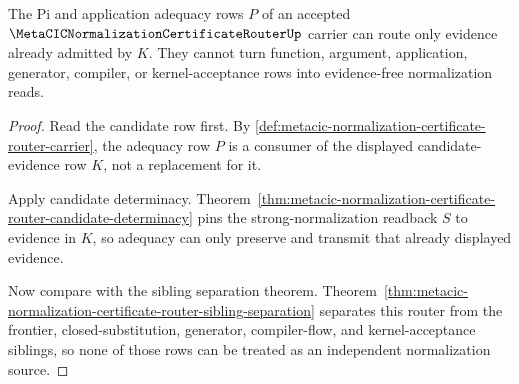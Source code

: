 \begin{theorem}
\label{thm:metacic-normalization-certificate-router-adequacy-chain}
The Pi and application adequacy rows $P$ of an accepted $\MetaCICNormalizationCertificateRouterUp$ carrier can route only evidence already admitted by $K$. They cannot turn function, argument, application, generator, compiler, or kernel-acceptance rows into evidence-free normalization reads.
\end{theorem}
\begin{proof}
Read the candidate row first. By \autoref{def:metacic-normalization-certificate-router-carrier}, the adequacy row $P$ is a consumer of the displayed candidate-evidence row $K$, not a replacement for it.

Apply candidate determinacy. Theorem~\ref{thm:metacic-normalization-certificate-router-candidate-determinacy} pins the strong-normalization readback $S$ to evidence in $K$, so adequacy can only preserve and transmit that already displayed evidence.

Now compare with the sibling separation theorem. Theorem~\ref{thm:metacic-normalization-certificate-router-sibling-separation} separates this router from the frontier, closed-substitution, generator, compiler-flow, and kernel-acceptance siblings, so none of those rows can be treated as an independent normalization source.
\end{proof}

